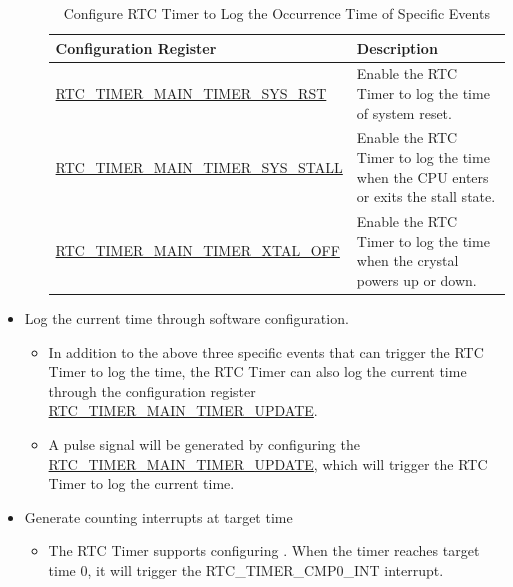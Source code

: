 \documentclass[main\_\_EN.tex]{subfiles}
\begin{document}
\begin{itemize}
\begin{itemize}
        \begin{longtable}[c]{|p{6cm}|p{9cm}|}
        \caption{Configure RTC Timer to Log the Occurrence Time of Specific Events} \label{tab:configure-rtc-timer-log-time-of-specific-events}
        \\\hline
        \rowcolor{lightgray}
        \textbf{Configuration Register} & \textbf{Description} \\
        \hline
        \hyperref[fielddesc:RTCTIMERMAINTIMERSYSRST]{RTC\_TIMER\_MAIN\_TIMER\_SYS\_RST} &  Enable the RTC Timer to log the time of system reset. \\
        \hline
        \hyperref[fielddesc:RTCTIMERMAINTIMERSYSSTALL]{RTC\_TIMER\_MAIN\_TIMER\_SYS\_STALL} & Enable the RTC Timer to log the time when the CPU enters or exits the stall state.\\
        \hline
        \hyperref[fielddesc:RTCTIMERMAINTIMERXTALOFF]{RTC\_TIMER\_MAIN\_TIMER\_XTAL\_OFF} &  Enable the RTC Timer to log the time when the crystal powers up or down.\\
        \hline
        \end{longtable}
    \end{itemize}


    \item Log the current time through software configuration.
    \begin{itemize}
        \item In addition to the above three specific events that can trigger the RTC Timer to log the time, the RTC Timer can also log the current time through the configuration register \hyperref[fielddesc:RTCTIMERMAINTIMERUPDATE]{RTC\_TIMER\_MAIN\_TIMER\_UPDATE}.
        \item A pulse signal will be generated by configuring the \hyperref[fielddesc:RTCTIMERMAINTIMERUPDATE]{RTC\_TIMER\_MAIN\_TIMER\_UPDATE}, which will trigger the RTC Timer to log the current time.
    \end{itemize}

    \item Generate counting interrupts at target time
    \begin{itemize}
        \item The RTC Timer supports configuring . When the timer reaches target time 0, it will trigger the RTC\_TIMER\_CMP0\_INT interrupt.


\end{itemize}
\end{itemize}
\end{document}
